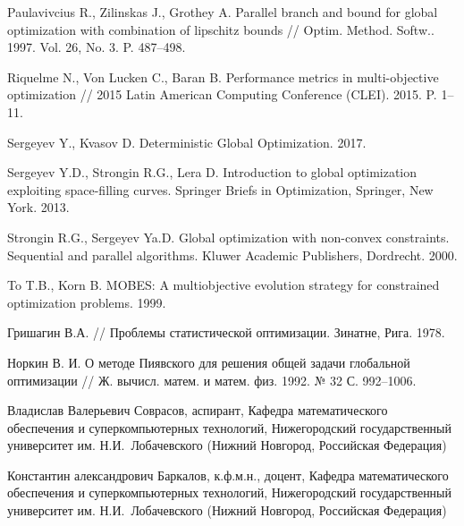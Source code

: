 \documentclass{cmi}
\begin{document}
\begin{biblio}
  {Paulavivcius R., Zilinskas J., Grothey A.}
  \newblock Parallel branch and bound for global optimization with combination of
    lipschitz bounds //
  \newblock Optim. Method. Softw.. 1997. Vol. 26, No. 3. P. 487--498.
  \newblock {}

  {Riquelme} N., {Von Lucken} C., {Baran} B.
  \newblock Performance metrics in multi-objective optimization
  \newblock // 2015 Latin American Computing Conference (CLEI). 2015. P. 1--11.
  \newblock {}

  Sergeyev Y., Kvasov D. Deterministic Global Optimization. 2017.
  \newblock {}

  {Sergeyev Y.D., Strongin R.G., Lera D.} Introduction to global optimization
    exploiting space-filling curves.
  \newblock Springer Briefs in Optimization, Springer, New York. 2013.
  \newblock {}

  {Strongin R.G., Sergeyev Ya.D.} Global optimization with non-convex
    constraints. Sequential and parallel algorithms.
  \newblock Kluwer Academic Publishers, Dordrecht. 2000.
  \newblock {}

  To T.B., Korn B.
  \newblock MOBES: A multiobjective evolution strategy for constrained
    optimization problems. 1999.

  {Гришагин В.А.}
  \newblock // Проблемы статистической
    оптимизации. Зинатне, Рига. 1978.

  {Норкин В. И.}
  \newblock О методе Пиявского для решения общей
    задачи глобальной оптимизации //
  \newblock Ж. вычисл. матем. и матем. физ. 1992. № 32 С. 992--1006.
\end{biblio}

Владислав Валерьевич Соврасов, аспирант, Кафедра математического обеспечения и
суперкомпьютерных технологий, Нижегородский государственный университет им. Н.И.~Лобачевского (Нижний Новгород, Российская Федерация)

Константин александрович Баркалов, к.ф.м.н., доцент, Кафедра математического обеспечения и
суперкомпьютерных технологий, Нижегородский государственный университет им. Н.И.~Лобачевского (Нижний Новгород, Российская Федерация)
\end{document}
